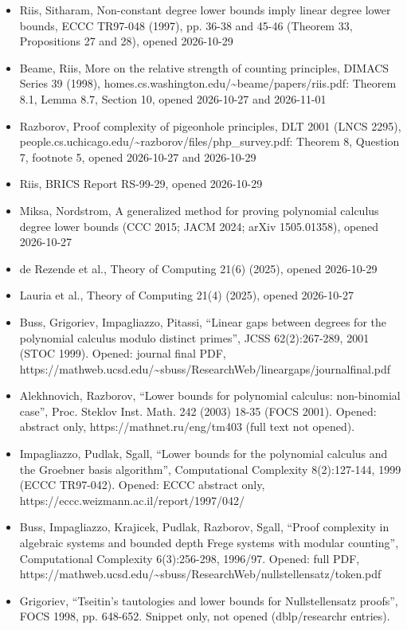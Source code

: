 \documentclass{article}
\begin{document}
\begin{itemize}
\item Riis, Sitharam, Non-constant degree lower bounds imply linear degree lower bounds, ECCC TR97-048 (1997), pp. 36-38 and 45-46 (Theorem 33, Propositions 27 and 28), opened 2026-10-29
\item Beame, Riis, More on the relative strength of counting principles, DIMACS Series 39 (1998), homes.cs.washington.edu/\textasciitilde{}beame/papers/riis.pdf: Theorem 8.1, Lemma 8.7, Section 10, opened 2026-10-27 and 2026-11-01
\item Razborov, Proof complexity of pigeonhole principles, DLT 2001 (LNCS 2295), people.cs.uchicago.edu/\textasciitilde{}razborov/files/php\_survey.pdf: Theorem 8, Question 7, footnote 5, opened 2026-10-27 and 2026-10-29
\item Riis, BRICS Report RS-99-29, opened 2026-10-29
\item Miksa, Nordstrom, A generalized method for proving polynomial calculus degree lower bounds (CCC 2015; JACM 2024; arXiv 1505.01358), opened 2026-10-27
\item de Rezende et al., Theory of Computing 21(6) (2025), opened 2026-10-29
\item Lauria et al., Theory of Computing 21(4) (2025), opened 2026-10-27
\item Buss, Grigoriev, Impagliazzo, Pitassi, ``Linear gaps between degrees for the polynomial calculus modulo distinct primes'', JCSS 62(2):267-289, 2001 (STOC 1999). Opened: journal final PDF, https://mathweb.ucsd.edu/\textasciitilde{}sbuss/ResearchWeb/lineargaps/journalfinal.pdf
\item Alekhnovich, Razborov, ``Lower bounds for polynomial calculus: non-binomial case'', Proc. Steklov Inst. Math. 242 (2003) 18-35 (FOCS 2001). Opened: abstract only, https://mathnet.ru/eng/tm403 (full text not opened).
\item Impagliazzo, Pudlak, Sgall, ``Lower bounds for the polynomial calculus and the Groebner basis algorithm'', Computational Complexity 8(2):127-144, 1999 (ECCC TR97-042). Opened: ECCC abstract only, https://eccc.weizmann.ac.il/report/1997/042/
\item Buss, Impagliazzo, Krajicek, Pudlak, Razborov, Sgall, ``Proof complexity in algebraic systems and bounded depth Frege systems with modular counting'', Computational Complexity 6(3):256-298, 1996/97. Opened: full PDF, https://mathweb.ucsd.edu/\textasciitilde{}sbuss/ResearchWeb/nullstellensatz/token.pdf
\item Grigoriev, ``Tseitin's tautologies and lower bounds for Nullstellensatz proofs'', FOCS 1998, pp. 648-652. Snippet only, not opened (dblp/researchr entries).

\end{itemize}
\end{document}
